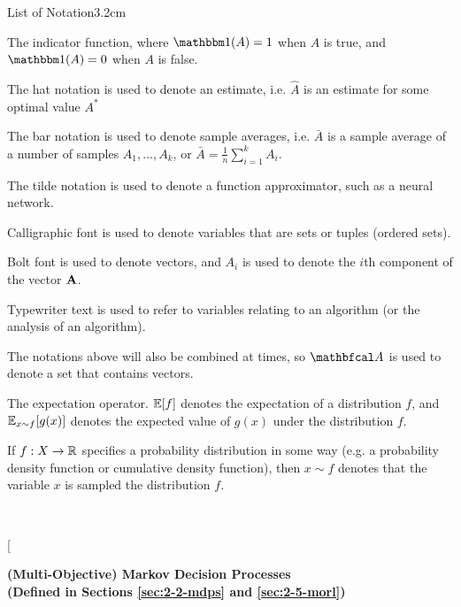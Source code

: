 \begin{mclistof}{List of Notation}{3.2cm}
    \item[\Large\textbf{General Notation}\hfill\hfill]
    \item[$\one$] 
        The indicator function, where $\one(A)=1$ when $A$ is true, and $\one(A)=0$ when $A$ is false. 
    \item[$\hat{A}$] 
        The hat notation is used to denote an estimate, i.e. $\hat{A}$ is an estimate for some optimal value $A^*$
    \item[$\bar{A}$] 
        The bar notation is used to denote sample averages, i.e. $\bar{A}$ is a sample average of a number of samples $A_1,...,A_k$, or $\bar{A}=\frac{1}{n}\sum_{i=1}^k A_i$.
    \item[$\tilde{A}$] 
        The tilde notation is used to denote a function approximator, such as a neural network.
    \item[$\cl{A}$] 
        Calligraphic font is used to denote variables that are sets or tuples (ordered sets).
    \item[$\bff{A}$] 
        Bolt font is used to denote vectors, and $A_i$ is used to denote the $i$th component of the vector $\bff{A}$.
    \item[$\texttt{A}$]
        Typewriter text is used to refer to variables relating to an algorithm (or the analysis of an algorithm).
    \item[$\bfcl{A}$] 
        The notations above will also be combined at times, so $\bfcl{A}$ is used to denote a set that contains vectors.
    \item[$\bb{E}$] 
        The expectation operator. $\mathbb{E}[f]$ denotes the expectation of a distribution $f$, and $\mathbb{E}_{x\sim f}[g(x)]$ denotes the expected value of $g(x)$ under the distribution $f$.
    \item[$x\sim f$] 
        If $f:X\rightarrow\mathbb{R}$ specifies a probability distribution in some way (e.g. a probability density function or cumulative density function), then $x\sim f$ denotes that the variable $x$ is sampled the distribution $f$.
    \item[$O(f(x))$]
    \\
    \item[{\parbox[t]{\textwidth}{
            \Large\textbf{(Multi-Objective) Markov Decision Processes \\(Defined in Sections \ref{sec:2-2-mdps} and \ref{sec:2-5-morl})}\hfill\hfill
}}
\end{mclistof}
